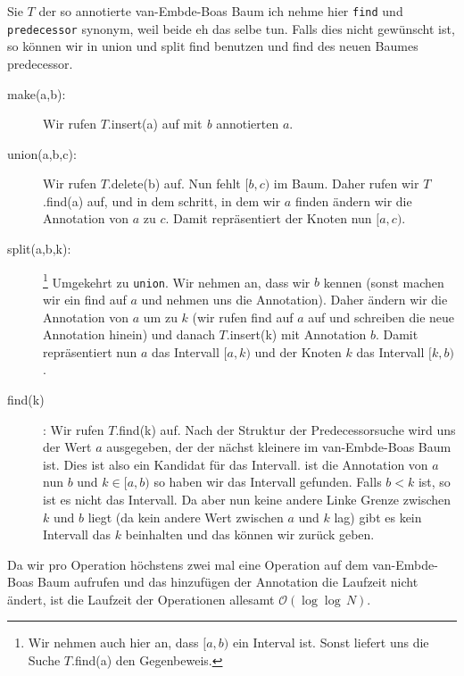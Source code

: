 \documentclass[11pt,a4paper,ngerman]{article}
\begin{document}
Sie $T$ der so annotierte van-Embde-Boas Baum ich nehme hier \lstinline|find| und \lstinline|predecessor| synonym, weil beide eh das selbe tun. Falls
dies nicht gewünscht ist, so können wir in union und split find benutzen und find des neuen Baumes predecessor.

\begin{description}
	\item[make(a,b):]  Wir rufen $T$.insert(a) auf mit \emph{b} annotierten $a$.
	\item[union(a,b,c):] Wir rufen $T$.delete(b) auf. Nun fehlt $[b,c)$ im Baum. Daher rufen wir $T$.find(a) auf, und
		in dem schritt, in dem wir $a$ finden ändern wir die Annotation von $a$ zu $c$. Damit repräsentiert der Knoten nun $[a,c)$.
	\item[split(a,b,k):]\footnote{Wir nehmen auch hier an, dass $[a,b)$ ein Interval ist. Sonst liefert uns die Suche $T$.find(a) den Gegenbeweis.}
		 Umgekehrt zu \lstinline|union|. Wir nehmen an, dass wir $b$ kennen (sonst machen wir ein find auf $a$ und nehmen
		uns die Annotation). Daher ändern wir die Annotation von $a$ um zu $k$ (wir rufen find auf $a$ auf und schreiben die neue Annotation 	
		hinein) und danach $T$.insert(k) mit Annotation $b$. Damit repräsentiert nun $a$ das Intervall $[a,k)$ und der Knoten $k$ das Intervall
		$[k,b)$. 
	\item[find(k)] : Wir rufen $T$.find(k) auf. Nach der Struktur der Predecessorsuche wird uns der Wert $a$ ausgegeben, der der nächst kleinere
		im van-Embde-Boas Baum ist. Dies ist also ein Kandidat für das Intervall. ist die Annotation von $a$ nun $b$ und $k \in [a,b)$ so
		haben wir das Intervall gefunden. Falls $b < k$ ist, so ist es nicht das Intervall. Da aber nun keine andere Linke Grenze zwischen $k$ und 		
		$b$ liegt (da kein andere Wert zwischen $a$ und $k$ lag) gibt es kein Intervall das $k$ beinhalten und das können wir zurück geben.
\end{description}

Da wir pro Operation höchstens zwei mal eine Operation auf dem van-Embde-Boas Baum aufrufen und das hinzufügen der Annotation die Laufzeit nicht ändert, ist die Laufzeit der Operationen allesamt $\mathcal{O}(\log \log \, N)$.

\label{LastPage}
\end{document}
